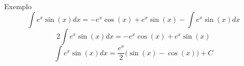 \begin{frame}{Exemplo \theexemplo}
  \[ \int e^x \sin(x) dx  = -e^x \cos(x) + e^x \sin(x) - \int e^x \sin(x) dx \]
  \pause
  \[ 2\int e^x \sin(x) dx = -e^x \cos(x)+ e^x \sin(x)                        \]
  \pause
  \[ \int e^x \sin(x) dx  = \frac{e^x}{2}\big(\sin(x) -\cos(x)\big) + C      \]
\end{frame}

%
%
%
%
%

